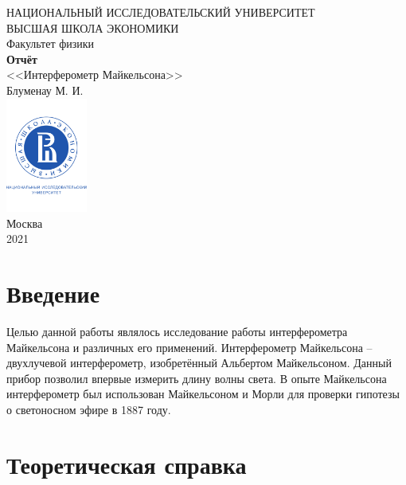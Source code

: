 \documentclass[a4paper, 12pt]{article}
\begin{document}
	\begin{titlepage}
		\begin{center}
			$$$$
			$$$$
			$$$$
			$$$$
			{\Large{НАЦИОНАЛЬНЫЙ ИССЛЕДОВАТЕЛЬСКИЙ УНИВЕРСИТЕТ}}\\
			\vspace{0.1cm}
			{\Large{ВЫСШАЯ ШКОЛА ЭКОНОМИКИ}}\\
			\vspace{0.25cm}
			{\large{Факультет физики}}\\
			\vspace{5.5cm}
			{\Huge\textbf{{Отчёт}}}\\%
			\vspace{1cm}
			{\LARGE{<<Интерферометр Майкельсона>>}}\\%
			\vspace{1cm}
			{\LARGE{Блуменау М. И.}}\\
			\vspace{2cm}
			\vfill
			\includegraphics[width = 0.2\textwidth]{HSElogo}\\
			\vfill
			Москва\\
			2021
		\end{center}
	\end{titlepage}
	
	\tableofcontents
	\newpage
	\section*{Введение}
	Целью данной работы являлось исследование работы интерферометра Майкельсона и различных его применений. Интерферометр Майкельсона -- двухлучевой интерферометр, изобретённый Альбертом Майкельсоном. Данный прибор позволил впервые измерить длину волны света. В опыте Майкельсона интерферометр был использован Майкельсоном и Морли для проверки гипотезы о светоносном эфире в 1887 году. 
	\section*{Теоретическая справка}
\end{document}
